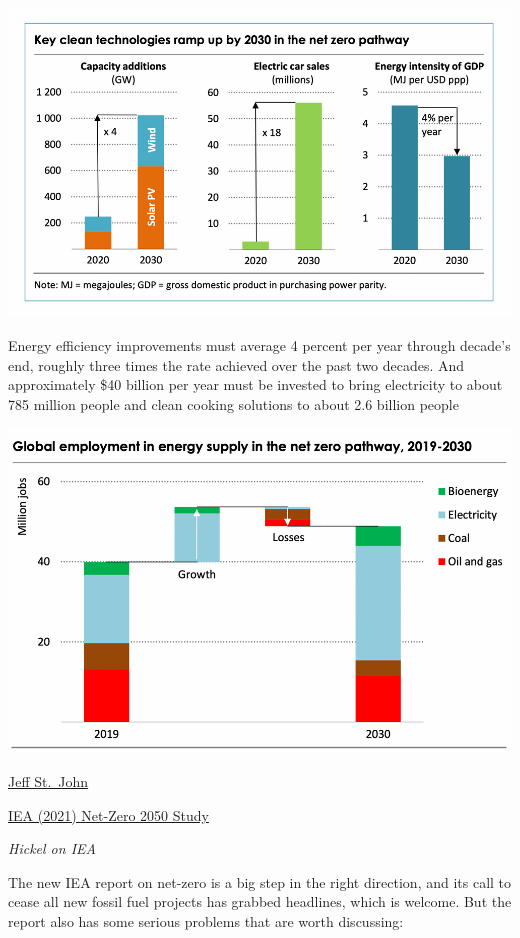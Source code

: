 \documentclass[
]{book}
\begin{document}
\includegraphics{fig/clean_technology_ramp-up_2030.png}

Energy efficiency improvements must average 4 percent per year through decade's end, roughly three times the rate achieved over the past two decades. And approximately \$40 billion per year must be invested to bring electricity to about 785 million people and clean cooking solutions to about 2.6 billion people

\includegraphics{fig/clean_technology_ramp-up_employment_2030.png}

\href{https://www.canarymedia.com/articles/iea-world-is-on-the-knifes-edge-of-reaching-net-zero-carbon-by-2050/}{Jeff St.~John}

\href{https://www.iea.org/reports/net-zero-by-2050}{IEA (2021) Net-Zero 2050 Study}

\emph{Hickel on IEA}

The new IEA report on net-zero is a big step in the right direction, and its call to cease all new fossil fuel projects has grabbed headlines, which is welcome. But the report also has some serious problems that are worth discussing:
\end{document}
